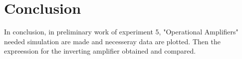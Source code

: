 \documentclass[letterpaper,12pt]{article}
\begin{document}
\section{Conclusion}
In conclusion, in preliminary work of experiment 5, "Operational Amplifiers"  needed simulation are made and necesseray data are plotted. Then the expreession for the inverting amplifier obtained and compared.



\end{document}
